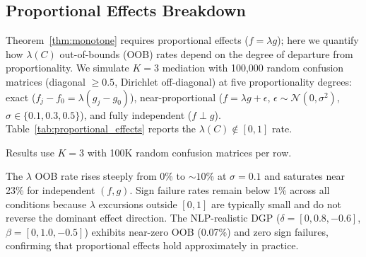 

\subsection{Proportional Effects Breakdown}
\label{sec:proportional_effects}

Theorem~\ref{thm:monotone} requires proportional effects ($f = \lambda g$); here we quantify how $\lambda(C)$ out-of-bounds (OOB) rates depend on the degree of departure from proportionality. We simulate $K{=}3$ mediation with 100{,}000 random confusion matrices (diagonal $\geq 0.5$, Dirichlet off-diagonal) at five proportionality degrees: exact ($f_j {-} f_0 = \lambda(g_j {-} g_0)$), near-proportional ($f = \lambda g + \epsilon$, $\epsilon \sim \mathcal{N}(0,\sigma^2)$, $\sigma \in \{0.1, 0.3, 0.5\}$), and fully independent ($f \perp g$). Table~\ref{tab:proportional_effects} reports the $\lambda(C) \notin [0,1]$ rate.

Results use $K{=}3$ with 100K random confusion matrices per row.

\begin{table}[H]
\centering
\small
\caption{$\lambda(C)$ out-of-bounds rate and mediation sign failure rate.}
\label{tab:proportional_effects}
\end{table}

The $\lambda$ OOB rate rises steeply from 0\% to ${\sim}10$\% at $\sigma{=}0.1$ and saturates near 23\% for independent $(f,g)$. Sign failure rates remain below 1\% across all conditions because $\lambda$ excursions outside $[0,1]$ are typically small and do not reverse the dominant effect direction. The NLP-realistic DGP ($\delta{=}[0, 0.8, {-}0.6]$, $\beta{=}[0, 1.0, {-}0.5]$) exhibits near-zero OOB (0.07\%) and zero sign failures, confirming that proportional effects hold approximately in practice.

